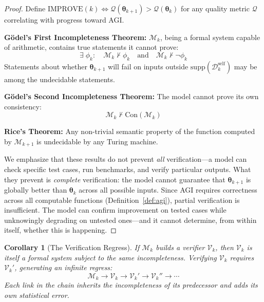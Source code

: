 \documentclass[11pt,a4paper]{article}
\newtheorem{corollary}[theorem]{Corollary}
\begin{document}
\begin{proof}
Define $\mathrm{IMPROVE}(k) \iff \mathcal{Q}(\bm{\theta}_{k+1}) > \mathcal{Q}(\bm{\theta}_k)$ for any quality metric $\mathcal{Q}$ correlating with progress toward AGI.

\textbf{G\"{o}del's First Incompleteness Theorem:} $\mathcal{M}_k$, being a formal system capable of arithmetic, contains true statements it cannot prove:
\begin{equation}
\exists\; \phi_k: \quad \mathcal{M}_k \nvdash \phi_k \quad \text{and} \quad \mathcal{M}_k \nvdash \neg\phi_k
\end{equation}
Statements about whether $\bm{\theta}_{k+1}$ will fail on inputs outside $\mathrm{supp}(\mathcal{D}_k^{\mathrm{self}})$ may be among the undecidable statements.

\textbf{G\"{o}del's Second Incompleteness Theorem:} The model cannot prove its own consistency:
\begin{equation}
\mathcal{M}_k \nvdash \mathrm{Con}(\mathcal{M}_k)
\end{equation}

\textbf{Rice's Theorem:} Any non-trivial semantic property of the function computed by $\mathcal{M}_{k+1}$ is undecidable by any Turing machine.

We emphasize that these results do not prevent \emph{all} verification---a model can check specific test cases, run benchmarks, and verify particular outputs. What they prevent is \emph{complete} verification: the model cannot guarantee that $\bm{\theta}_{k+1}$ is globally better than $\bm{\theta}_k$ across all possible inputs. Since AGI requires correctness across all computable functions (Definition~\ref{def:agi}), partial verification is insufficient. The model can confirm improvement on tested cases while unknowingly degrading on untested ones---and it cannot determine, from within itself, whether this is happening.
\end{proof}

\begin{corollary}[The Verification Regress]
\label{cor:regress}
If $\mathcal{M}_k$ builds a verifier $\mathcal{V}_k$, then $\mathcal{V}_k$ is itself a formal system subject to the same incompleteness. Verifying $\mathcal{V}_k$ requires $\mathcal{V}_k'$, generating an infinite regress:
\begin{equation}
\mathcal{M}_k \to \mathcal{V}_k \to \mathcal{V}_k' \to \mathcal{V}_k'' \to \cdots
\end{equation}
Each link in the chain inherits the incompleteness of its predecessor and adds its own statistical error.
\end{corollary}
\end{document}
